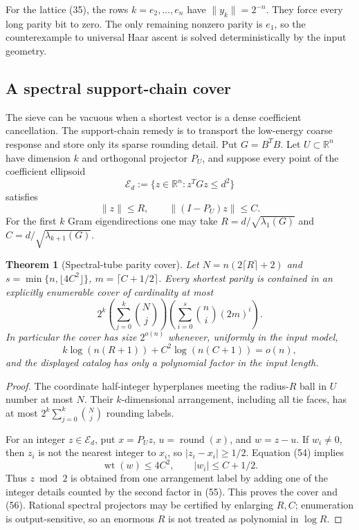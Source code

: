 \documentclass[10pt]{article}
\newtheorem{theorem}{Theorem}[section]
\theoremstyle{definition}
\newcommand{\R}{\mathbb{R}}
\newcommand{\norm}[1]{\lVert #1\rVert}
\newcommand{\cE}{\mathcal{E}}
\begin{document}
For the lattice (35), the rows $k=e_2,\ldots,e_n$ have
$\norm{y_k}=2^{-n}$.  They force every long parity bit to zero.  The only
remaining nonzero parity is $e_1$, so the counterexample to universal Haar
ascent is solved deterministically by the input geometry.

\subsection{A spectral support-chain cover}

The sieve can be vacuous when a shortest vector is a dense coefficient
cancellation.  The support-chain remedy is to transport the low-energy
coarse response and store only its sparse rounding detail.  Put $G=B^TB$.
Let $U\subset\R^n$ have dimension $k$ and orthogonal projector $P_U$, and
suppose every point of the coefficient ellipsoid
\[
 \cE_d:=\{z\in\R^n:z^TGz\le d^2\}                              \tag{53}
\]
satisfies
\[
 \norm z\le R,
 \qquad \norm{(I-P_U)z}\le C.                                 \tag{54}
\]
For the first $k$ Gram eigendirections one may take
$R=d/\sqrt{\lambda_1(G)}$ and
$C=d/\sqrt{\lambda_{k+1}(G)}$.

\begin{theorem}[Spectral-tube parity cover]                      \label{thm:tube}
Let $N=n(2\lceil R\rceil+2)$ and
$s=\min\{n,\lfloor4C^2\rfloor\}$, $m=\lceil C+1/2\rceil$.
Every shortest parity is contained in an explicitly enumerable cover of
cardinality at most
\[
 2^k\left(\sum_{j=0}^k\binom Nj\right)
 \left(\sum_{i=0}^s\binom ni(2m)^i\right).                     \tag{55}
\]
In particular the cover has size $2^{o(n)}$ whenever, uniformly in the
input model,
\[
 k\log(n(R+1))+C^2\log(n(C+1))=o(n),                            \tag{56}
\]
and the displayed catalog has only a polynomial factor in the input length.
\end{theorem}

\begin{proof}
The coordinate half-integer hyperplanes meeting the radius-$R$ ball in $U$
number at most $N$.  Their $k$-dimensional arrangement, including all tie
faces, has at most $2^k\sum_{j=0}^k\binom Nj$ rounding labels.

For an integer $z\in\cE_d$, put $x=P_Uz$, $u=\operatorname{round}(x)$, and
$w=z-u$.  If $w_i\ne0$, then $z_i$ is not the nearest integer to $x_i$, so
$|z_i-x_i|\ge1/2$.  Equation (54) implies
\[
 \operatorname{wt}(w)\le4C^2,
 \qquad |w_i|\le C+1/2.
\]
Thus $z\bmod2$ is obtained from one arrangement label by adding one of the
integer details counted by the second factor in (55).  This proves the cover
and (56).  Rational spectral projectors may be certified by enlarging $R,C$;
enumeration is output-sensitive, so an enormous $R$ is not treated as
polynomial in $\log R$.
\end{proof}
\end{document}
